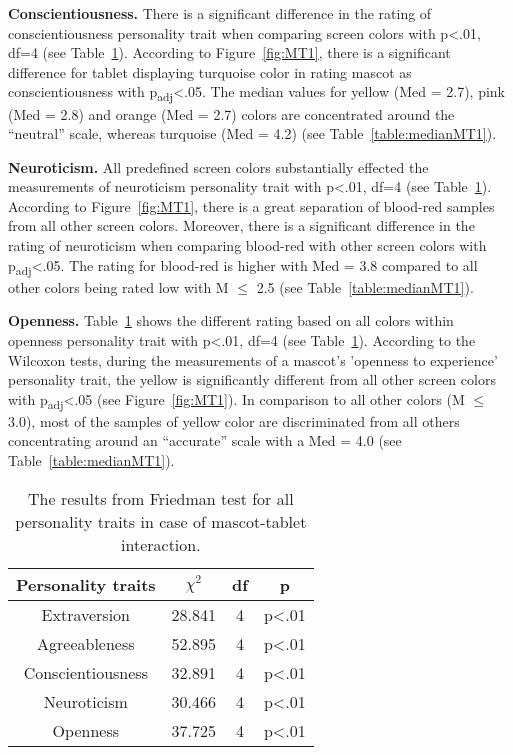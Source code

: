 \par\textbf{Conscientiousness.}
There is a significant difference in the rating of conscientiousness personality trait
when comparing screen colors with p<.01, df=4 (see Table~\ref{table:friedmanMT1}).
According to Figure~\ref{fig:MT1}, there is a significant difference for
tablet displaying turquoise color in rating mascot as conscientiousness with p\textsubscript{adj}<.05.
The median values for yellow (Med = 2.7), pink (Med = 2.8) and orange (Med = 2.7) colors are
concentrated around the “neutral” scale, whereas turquoise (Med = 4.2) (see Table~\ref{table:medianMT1}).

\par\textbf{Neuroticism.}
All predefined screen colors substantially effected the measurements of neuroticism personality
trait with p<.01, df=4 (see Table~\ref{table:friedmanMT1}).
According to Figure~\ref{fig:MT1}, there is a great separation of blood-red
samples from all other screen colors.
Moreover, there is a significant difference in the rating of neuroticism when comparing
blood-red with other screen colors with p\textsubscript{adj}<.05.
The rating for blood-red is higher with Med = 3.8 compared to all other colors
being rated low with M $\leq$ 2.5 (see Table~\ref{table:medianMT1}).

\par\textbf{Openness.}
Table~\ref{table:friedmanMT1} shows the different rating based on all colors within openness
personality trait with p<.01, df=4 (see Table~\ref{table:friedmanMT1}).
According to the Wilcoxon tests, during the measurements of a mascot's 'openness to experience'
personality trait, the yellow is significantly different from all other screen
colors with p\textsubscript{adj}<.05 (see Figure~\ref{fig:MT1}).
In comparison to all other colors (M $\leq$ 3.0), most of the samples of yellow color are discriminated
from all others concentrating around an “accurate” scale with a Med = 4.0 (see Table~\ref{table:medianMT1}).

\begin{table}[H]
    \renewcommand{\arraystretch}{1}
    \begin{center}
        \begin{tabular}{|c|c|c|c|}
            \hline
            \textbf{Personality traits} & \textbf{$\chi^2$} & \textbf{df} & \textbf{p} \\
            \hline
            Extraversion &28.841 &4 &p<.01 \\
            Agreeableness &52.895 &4 &p<.01 \\
            Conscientiousness &32.891 &4 &p<.01 \\
            Neuroticism &30.466 &4 &p<.01 \\
            Openness &37.725 &4 &p<.01 \\
            \hline
        \end{tabular}
        \caption{The results from Friedman test for all personality traits in case of mascot-tablet interaction.}
        \label{table:friedmanMT1}
    \end{center}
\end{table}


